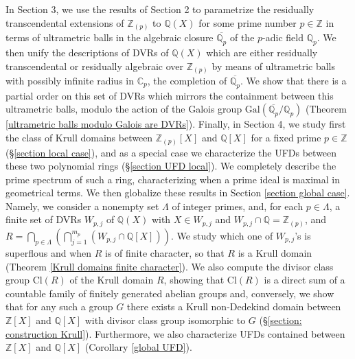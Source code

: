 \documentclass[10pt]{article}
\numberwithin{equation}{section}
\theoremstyle{definition}
\theoremstyle{definition}
\newcommand{\Q}{\mathbb{Q}}
\newcommand{\Z}{\mathbb{Z}}
\newcommand{\C}{\mathbb{C}}
\newcommand{\oQp}{\overline{\Q_p}}
\newcommand{\Gal}{\text{Gal}}
\begin{document}
In Section 3, we use the results of Section 2 to parametrize the residually transcendental extensions of $\mathbb{Z}_{(p)}$ to $\Q(X)$ for some prime number $p \in \Z$ in terms of ultrametric balls in the algebraic closure $\oQp$ of the $p$-adic field $\Q_p$. We then unify the descriptions of DVRs of $\Q(X)$ which are either residually transcendental or residually algebraic  over $\Z_{(p)}$ by means of ultrametric balls with possibly infinite radius in $\C_p$, the completion of $\oQp$. We show that there is a partial order on this set of DVRs which mirrors the containment between this ultrametric balls, modulo the action of the Galois group $\Gal(\oQp/\Q_p)$ (Theorem \ref{ultrametric balls modulo Galois are DVRs}). Finally, in Section 4, we study first the class of Krull domains between $\Z_{(p)}[X]$ and $\Q[X]$ for a fixed prime $p\in\Z$ (\S \ref{section local case}), and as a special case we characterize the UFDs between these two polynomial rings (\S \ref{section UFD local}). We completely describe the prime spectrum of such a   ring, characterizing when a prime ideal is maximal in geometrical terms. We then globalize these results in Section \ref{section global case}. Namely, we consider a nonempty set $\Lambda$  of integer primes, and, for each $p\in\Lambda$, a finite set of DVRs $W_{p, j}$ of $\mathbb{Q}(X)$ with $X \in W_{p,j}$ and $W_{p,j} \cap \mathbb{Q} = \mathbb{Z}_{(p)}$,
and $R= \bigcap\limits_{p \in \Lambda}(\bigcap\limits_{j=1}^{m_p}(W_{p,j} \cap \mathbb{Q}[X]))$. We study which one of $W_{p,j}$'s is superflous 
and when $R$ is of finite character, so that $R$ is a Krull domain (Theorem \ref{Krull domains finite character}). 
We also compute the divisor class group Cl$(R)$ of the Krull domain $R$, showing that Cl$(R)$ is a direct sum of a countable family of finitely generated abelian groups and, conversely, we show that for any such a group $G$ there exists a Krull non-Dedekind domain between $\Z[X]$ and $\Q[X]$ with divisor class group isomorphic to $G$ (\S \ref{section: construction Krull}). Furthermore, we also characterize UFDs contained between $\Z[X]$ and $\Q[X]$ (Corollary \ref{global UFD}).



\end{document}
